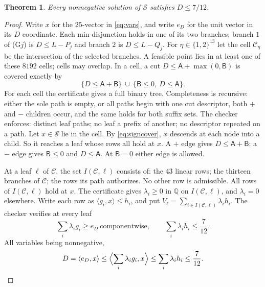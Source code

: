 \documentclass{amsart}
\newtheorem{theorem}{Theorem}
\numberwithin{equation}{section}
\numberwithin{table}{section}
\begin{document}
\begin{theorem}\label{thm:lp}
Every nonnegative solution of $\mathcal S$ satisfies $D\le7/12$.
\end{theorem}

\begin{proof}
Write $x$ for the $25$-vector in \eqref{eq:vars}, and write $e_D$ for the
unit vector in its $D$ coordinate.
Each min-disjunction holds in one of its two branches; branch $1$ of
(G$j$) is $D\le L-P_j$ and branch $2$ is $D\le L-Q_j$. For
$\eta\in\{1,2\}^{13}$ let the cell $\mathcal C_\eta$ be the intersection of the
selected branches. A feasible point lies in at least one of these $8192$
cells; cells may overlap. In a cell, a cut $D\le\mathsf A+\max(0,\mathsf B)$
is covered exactly by
\begin{equation}\label{eq:signcover}
 \{D\le\mathsf A+\mathsf B\}\ \cup\
 \{\mathsf B\le0,\ D\le\mathsf A\}.
\end{equation}
For each cell the certificate gives a full binary tree. Completeness is
recursive: either the sole path is empty, or all paths begin with one cut
descriptor, both $+$ and $-$ children occur, and the same holds for both
suffix sets. The checker enforces: distinct leaf paths; no leaf a prefix of another; no
descriptor repeated on a path. Let $x\in\mathcal S$ lie in the cell. By
\eqref{eq:signcover}, $x$ descends at each node into a child. So it reaches a
leaf whose rows all hold at $x$. A $+$
edge gives $D\le\mathsf A+\mathsf B$; a $-$ edge gives $\mathsf B\le0$ and
$D\le\mathsf A$. At $\mathsf B=0$ either edge is allowed.

At a leaf $\ell$ of $\mathcal C$, the set $I(\mathcal C,\ell)$ consists of:
the $43$ linear rows; the thirteen branches of $\mathcal C$; the rows its path
authorizes.
No other row is admissible. All rows of $I(\mathcal C,\ell)$ hold at $x$. The
certificate gives $\lambda_i\ge0$ in $\mathbb Q$ on $I(\mathcal C,\ell)$, and
$\lambda_i=0$ elsewhere. Write each row as $\langle g_i,x\rangle\le h_i$, and
put $V_\ell=\sum_{i\in I(\mathcal C,\ell)}\lambda_i h_i$. The checker verifies
at every leaf
\begin{equation}\label{eq:farkas}
 \sum_i\lambda_ig_i\ge e_D\ \text{componentwise},
 \qquad
 \sum_i\lambda_ih_i\le\frac7{12}.
\end{equation}
All variables being nonnegative,
\begin{equation}\label{eq:chain}
 D=\langle e_D,x\rangle
 \le\Bigl\langle\sum_i\lambda_ig_i,x\Bigr\rangle
 \le\sum_i\lambda_ih_i
 \le\frac7{12}. \qedhere
\end{equation}
\end{proof}
\end{document}
